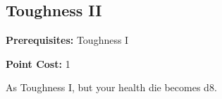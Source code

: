 \subsection*{Toughness II}\label{feat:toughness2}

\noindent
\textbf{Prerequisites:} Toughness I

\noindent
\textbf{Point Cost:} 1 

As Toughness I, but your health die becomes d8.
